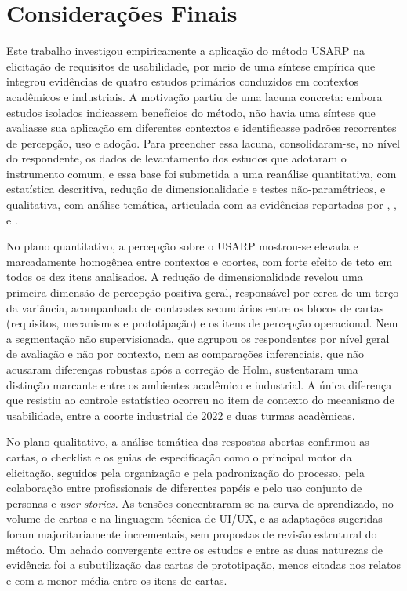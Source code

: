 \chapter{Considerações Finais}
\label{cap:conclusao}

Este trabalho investigou empiricamente a aplicação do método USARP na elicitação de requisitos de usabilidade, por meio de uma síntese empírica que integrou evidências de quatro estudos primários conduzidos em contextos acadêmicos e industriais. A motivação partiu de uma lacuna concreta: embora estudos isolados indicassem benefícios do método, não havia uma síntese que avaliasse sua aplicação em diferentes contextos e identificasse padrões recorrentes de percepção, uso e adoção. Para preencher essa lacuna, consolidaram-se, no nível do respondente, os dados de levantamento dos estudos que adotaram o instrumento comum, e essa base foi submetida a uma reanálise quantitativa, com estatística descritiva, redução de dimensionalidade e testes não-paramétricos, e qualitativa, com análise temática, articulada com as evidências reportadas por , ,  e .

No plano quantitativo, a percepção sobre o USARP mostrou-se elevada e marcadamente homogênea entre contextos e coortes, com forte efeito de teto em todos os dez itens analisados. A redução de dimensionalidade revelou uma primeira dimensão de percepção positiva geral, responsável por cerca de um terço da variância, acompanhada de contrastes secundários entre os blocos de cartas (requisitos, mecanismos e prototipação) e os itens de percepção operacional. Nem a segmentação não supervisionada, que agrupou os respondentes por nível geral de avaliação e não por contexto, nem as comparações inferenciais, que não acusaram diferenças robustas após a correção de Holm, sustentaram uma distinção marcante entre os ambientes acadêmico e industrial. A única diferença que resistiu ao controle estatístico ocorreu no item de contexto do mecanismo de usabilidade, entre a coorte industrial de 2022 e duas turmas acadêmicas.

No plano qualitativo, a análise temática das respostas abertas confirmou as cartas, o checklist e os guias de especificação como o principal motor da elicitação, seguidos pela organização e pela padronização do processo, pela colaboração entre profissionais de diferentes papéis e pelo uso conjunto de personas e \textit{user stories}. As tensões concentraram-se na curva de aprendizado, no volume de cartas e na linguagem técnica de UI/UX, e as adaptações sugeridas foram majoritariamente incrementais, sem propostas de revisão estrutural do método. Um achado convergente entre os estudos e entre as duas naturezas de evidência foi a subutilização das cartas de prototipação, menos citadas nos relatos e com a menor média entre os itens de cartas.

